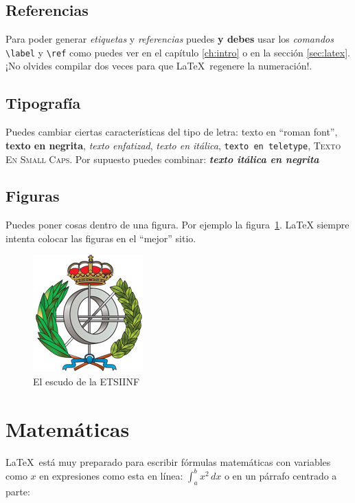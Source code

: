 \subsection{Referencias}

Para poder generar \emph{etiquetas} y \emph{referencias} puedes
\textbf{y debes} usar los \emph{comandos} \verb|\label| y
\verb|\ref| como puedes ver en el capítulo \ref{ch:intro} o en la
sección \ref{sec:latex}. ¡No olvides compilar dos veces para que
\LaTeX\ regenere la numeración!.

\subsection{Tipografía}

Puedes cambiar ciertas características del tipo de letra: \textrm{texto en ``roman font''}, \textbf{texto en negrita}, \emph{texto enfatizad}, \textit{texto en itálica}, \texttt{texto en teletype}, \textsc{Texto En Small Caps}. Por supuesto puedes combinar: \textbf{\textit{texto itálica en negrita}}

\subsection{Figuras}

Puedes poner cosas dentro de una figura. Por ejemplo la
figura~\ref{fig:escudo}. LaTeX siempre intenta colocar las figuras en
el ``mejor'' sitio.

\begin{figure}[h]
  \centering
  \includegraphics[width=0.33\linewidth]{include/escudo_etsiinf}
  \caption{El escudo de la ETSIINF}
  \label{fig:escudo}
\end{figure}

\section{Matemáticas}

\LaTeX\ está muy preparado para escribir fórmulas matemáticas con variables como $x$ en expresiones como esta en línea: \(\int_{a}^{b} x^2 \,dx\) o en un párrafo centrado a parte:

